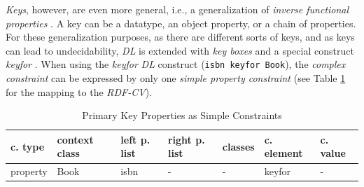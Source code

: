 \documentclass[a4paper,fontsize=11pt]{scrartcl}
\newcommand{\ms}[1]{\texttt{#1}}
\begin{document}
\emph{Keys}, however, are even more general, i.e., a generalization of \emph{inverse functional properties} \cite{Schneider2009}.
A key can be a datatype, an object property, or a chain of properties.
For these generalization purposes, as there are different sorts of keys, and as keys can lead to undecidability, 
\emph{DL} is extended with \emph{key boxes} and a special construct \emph{keyfor} \cite{Lutz2005}.
When using the \emph{keyfor} \emph{DL} construct (\ms{isbn keyfor Book}), the \emph{complex constraint} can be expressed by only one \emph{simple property constraint} (see Table \ref{tab:primary-key-properties-as-simple-constraints} for the mapping to the \emph{RDF-CV}).


\begin{table}
  \scriptsize
  \sffamily
  \vspace{0cm}
	\caption{Primary Key Properties as Simple Constraints}
	\label{tab:primary-key-properties-as-simple-constraints}
	\centering
		\begin{tabular}{l|l|l|l|l|l|l}
      \textbf{c. type} & \textbf{context class} & \textbf{left p. list} & \textbf{right p. list} & \textbf{classes} & \textbf{c. element} & \textbf{c. value} \\
      \hline
property & Book & isbn & - & - & keyfor & - \\
		\end{tabular}
\end{table}
\end{document}
